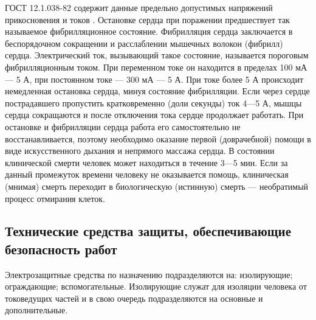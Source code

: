 ГОСТ 12.1.038-82 содержит данные предельно допустимых напряжений прикосновения и токов \cite{gost_electro}. 
Остановке сердца при поражении предшествует так называемое фибрилляционное состояние. Фибрилляция сердца заключается в беспорядочном сокращении и расслаблении мышечных волокон (фибрилл) сердца. Электрический ток, вызывающий такое состояние, называется пороговым фибрилляционным током. При переменном токе он находится в пределах 100 мА — 5 А, при постоянном токе — 300 мА — 5 А. При токе более 5 А происходит немедленная остановка сердца, минуя состояние фибрилляции. Если через сердце пострадавшего пропустить кратковременно (доли секунды) ток 4—5 А, мышцы сердца сокращаются и после отключения тока сердце продолжает работать. При остановке и фибрилляции сердца работа его самостоятельно не восстанавливается, поэтому необходимо оказание первой (доврачебной) помощи в виде искусственного дыхания и непрямого массажа сердца. В состоянии клинической смерти человек может находиться в течение 3—5 мин. Если за данный промежуток времени человеку не оказывается помощь, клиническая (мнимая) смерть переходит в биологическую (истинную) смерть — необратимый процесс отмирания клеток.

\subsection{Технические средства защиты, обеспечивающие безопасность работ}

Электрозащитные средства по назначению подразделяются на: изолирующие; ограждающие; вспомогательные. Изолирующие служат для изоляции человека от токоведущих частей и в свою очередь подразделяются на основные и дополнительные.

